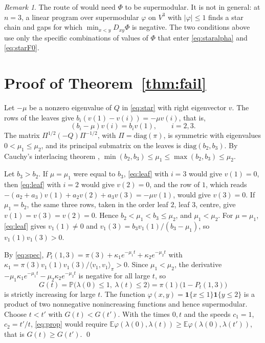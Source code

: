 \documentclass[11pt]{amsart}
\theoremstyle{remark}
\newtheorem{remark}[theorem]{Remark}
\numberwithin{equation}{section}
\newcommand{\E}{\mathbb E}
\newcommand{\Pp}{\mathbb P}
\newcommand{\1}{\mathbf 1}
\begin{document}
\begin{remark}\label{rem:notsm}
The route of \cite{BR} would need $\Phi$ to be supermodular. It is not in general: at $n=3$, a linear program over supermodular $\varphi$ on $V^3$ with $|\varphi|\le1$ finds a star chain and gaps for which $\min_{x<y}D_{xy}\Phi$ is negative. The two conditions above use only the specific combinations of values of $\Phi$ that enter \eqref{eq:staralpha} and \eqref{eq:starF0}.
\end{remark}

\section{Proof of Theorem~\ref{thm:fail}}\label{sec:fail}

Let $-\mu$ be a nonzero eigenvalue of $Q$ in \eqref{eq:star} with right eigenvector $v$. The rows of the leaves give $b_i(v(1)-v(i))=-\mu v(i)$, that is,
\begin{equation}\label{eq:leaf}
(b_i-\mu)v(i)=b_iv(1),\qquad i=2,3.
\end{equation}
The matrix $\Pi^{1/2}(-Q)\Pi^{-1/2}$, with $\Pi=\mathrm{diag}(\pi)$, is symmetric with eigenvalues $0<\mu_1\le\mu_2$, and its principal submatrix on the leaves is $\mathrm{diag}(b_2,b_3)$. By Cauchy's interlacing theorem \cite{HoJo}, $\min(b_2,b_3)\le\mu_1\le\max(b_2,b_3)\le\mu_2$.

Let $b_3>b_2$. If $\mu=\mu_1$ were equal to $b_3$, \eqref{eq:leaf} with $i=3$ would give $v(1)=0$, then \eqref{eq:leaf} with $i=2$ would give $v(2)=0$, and the row of $1$, which reads $-(a_2+a_3)v(1)+a_2v(2)+a_3v(3)=-\mu v(1)$, would give $v(3)=0$. If $\mu_1=b_2$, the same three rows, taken in the order leaf $2$, leaf $3$, centre, give $v(1)=v(3)=v(2)=0$. Hence $b_2<\mu_1<b_3\le\mu_2$, and $\mu_1<\mu_2$. For $\mu=\mu_1$, \eqref{eq:leaf} gives $v_1(1)\ne0$ and $v_1(3)=b_3v_1(1)/(b_3-\mu_1)$, so $v_1(1)v_1(3)>0$.

By \eqref{eq:spec}, $P_t(1,3)=\pi(3)+\kappa_1e^{-\mu_1t}+\kappa_2e^{-\mu_2t}$ with $\kappa_1=\pi(3)v_1(1)v_1(3)/\langle v_1,v_1\rangle_\pi>0$. Since $\mu_1<\mu_2$, the derivative $-\mu_1\kappa_1e^{-\mu_1t}-\mu_2\kappa_2e^{-\mu_2t}$ is negative for all large $t$, so
\[
G(t)=\Pp\bigl(\lambda(0)\le1,\ \lambda(t)\le2\bigr)=\pi(1)\bigl(1-P_t(1,3)\bigr)
\]
is strictly increasing for large $t$. The function $\varphi(x,y)=\1\{x\le1\}\1\{y\le2\}$ is a product of two nonnegative nonincreasing functions and hence supermodular. Choose $t<t'$ with $G(t)<G(t')$. With the times $0,t$ and the speeds $c_1=1$, $c_2=t'/t$, \eqref{eq:prop} would require $\E\varphi(\lambda(0),\lambda(t))\ge\E\varphi(\lambda(0),\lambda(t'))$, that is $G(t)\ge G(t')$. \qed
\end{document}
